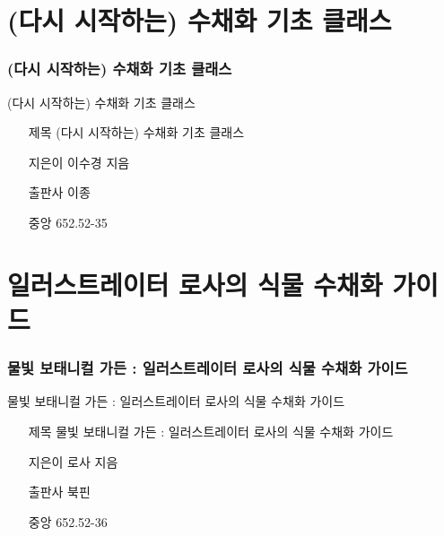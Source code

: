 \documentclass[aspectratio=1610,17pt,xcolor=pdftex,dvipsnames,table,handout]{beamer}
\begin{document}
		

		\section{(다시 시작하는) 수채화 기초 클래스}
		\begin{frame} [t,plain]
		\frametitle{(다시 시작하는) 수채화 기초 클래스}
			\begin{block} {(다시 시작하는) 수채화 기초 클래스}
			\setlength{\leftmargini}{4em}			
			\begin{itemize}
				\item [제목] (다시 시작하는) 수채화 기초 클래스
				\item [지은이] 이수경 지음	
				\item [출판사] 이종	
				\item [중앙] 652.52-35 		
			\end{itemize}
			\end{block}						
								
		\end{frame}						

		\section{일러스트레이터 로사의 식물 수채화 가이드 }
		\begin{frame} [t,plain]
		\frametitle{물빛 보태니컬 가든 : 일러스트레이터 로사의 식물 수채화 가이드 }
			\begin{block} {물빛 보태니컬 가든 : 일러스트레이터 로사의 식물 수채화 가이드 }
			\setlength{\leftmargini}{4em}			
			\begin{itemize}
				\item [제목] 물빛 보태니컬 가든 : 일러스트레이터 로사의 식물 수채화 가이드 
				\item [지은이] 로사 지음	
				\item [출판사] 북핀	
				\item [중앙] 652.52-36		
			\end{itemize}
			\end{block}						
								
		\end{frame}						

\end{document}
